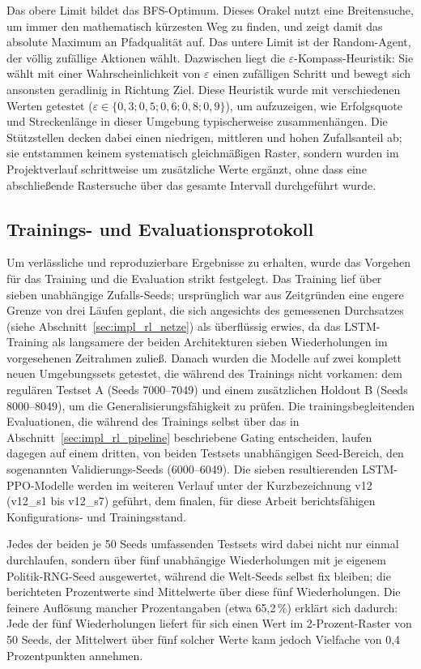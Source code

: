 \documentclass[
  a4paper,
  11pt,
  twoside,
  BCOR=8mm,           %
  headings=big,
  numbers=noenddot,
  listof=totoc,       %
  captions=tableheading,
]{scrreprt}
\begin{document}
Das obere Limit bildet das BFS-Optimum. Dieses Orakel nutzt eine Breitensuche, um immer den mathematisch kürzesten Weg zu finden, und zeigt damit das absolute Maximum an Pfadqualität auf. Das untere Limit ist der Random-Agent, der völlig zufällige Aktionen wählt. Dazwischen liegt die $\varepsilon$-Kompass-Heuristik: Sie wählt mit einer Wahrscheinlichkeit von $\varepsilon$ einen zufälligen Schritt und bewegt sich ansonsten geradlinig in Richtung Ziel. Diese Heuristik wurde mit verschiedenen Werten getestet ($\varepsilon \in \{0{,}3; 0{,}5; 0{,}6; 0{,}8; 0{,}9\}$), um aufzuzeigen, wie Erfolgsquote und Streckenlänge in dieser Umgebung typischerweise zusammenhängen. Die Stützstellen decken dabei einen niedrigen, mittleren und hohen Zufallsanteil ab; sie entstammen keinem systematisch gleichmäßigen Raster, sondern wurden im Projektverlauf schrittweise um zusätzliche Werte ergänzt, ohne dass eine abschließende Rastersuche über das gesamte Intervall durchgeführt wurde.

\subsection{Trainings- und Evaluationsprotokoll}
\label{sec:methodik_protokoll}

Um verlässliche und reproduzierbare Ergebnisse zu erhalten, wurde das Vorgehen für das Training und die Evaluation strikt festgelegt. Das Training lief über sieben unabhängige Zufalls-Seeds; ursprünglich war aus Zeitgründen eine engere Grenze von drei Läufen geplant, die sich angesichts des gemessenen Durchsatzes (siehe Abschnitt~\ref{sec:impl_rl_netze}) als überflüssig erwies, da das LSTM-Training als langsamere der beiden Architekturen sieben Wiederholungen im vorgesehenen Zeitrahmen zuließ. Danach wurden die Modelle auf zwei komplett neuen Umgebungssets getestet, die während des Trainings nicht vorkamen: dem regulären Testset A (Seeds 7000–7049) und einem zusätzlichen Holdout B (Seeds 8000–8049), um die Generalisierungsfähigkeit zu prüfen. Die trainingsbegleitenden Evaluationen, die während des Trainings selbst über das in Abschnitt~\ref{sec:impl_rl_pipeline} beschriebene Gating entscheiden, laufen dagegen auf einem dritten, von beiden Testsets unabhängigen Seed-Bereich, den sogenannten Validierungs-Seeds (6000–6049). Die sieben resultierenden LSTM-PPO-Modelle werden im weiteren Verlauf unter der Kurzbezeichnung v12 (v12\_s1 bis v12\_s7) geführt, dem finalen, für diese Arbeit berichtsfähigen Konfigurations- und Trainingsstand.

Jedes der beiden je 50 Seeds umfassenden Testsets wird dabei nicht nur einmal durchlaufen, sondern über fünf unabhängige Wiederholungen mit je eigenem Politik-RNG-Seed ausgewertet, während die Welt-Seeds selbst fix bleiben; die berichteten Prozentwerte sind Mittelwerte über diese fünf Wiederholungen. Die feinere Auflösung mancher Prozentangaben (etwa 65,2\,\%) erklärt sich dadurch: Jede der fünf Wiederholungen liefert für sich einen Wert im 2-Prozent-Raster von 50 Seeds, der Mittelwert über fünf solcher Werte kann jedoch Vielfache von 0,4 Prozentpunkten annehmen.
\end{document}
